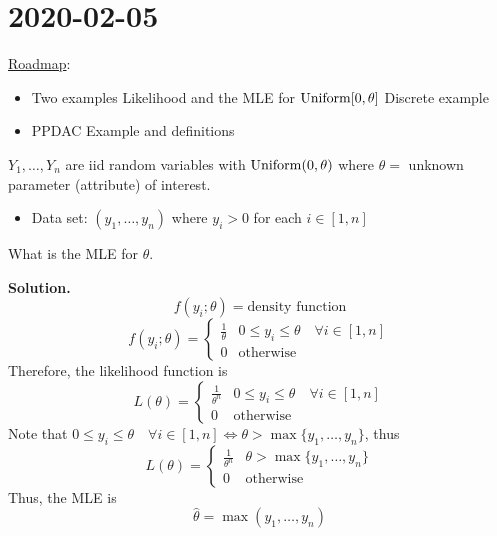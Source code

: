 \section{2020-02-05}
\underline{Roadmap}:
\begin{itemize}
    \item Two examples
          \subitem Likelihood and the MLE for $ \operatorname{Uniform}[0,\theta] $
          \subitem Discrete example
    \item PPDAC
          \subitem Example and definitions
\end{itemize}
\begin{exbox}
    \begin{example}\label{uniform mle}
        $ Y_1,\ldots ,Y_n $ are iid random variables with $ \operatorname{Uniform}(0,\theta) $
        where $ \theta= $ unknown parameter (attribute) of interest.
        \begin{itemize}
            \item Data set: $ (y_1,\ldots ,y_n) $ where $ y_i>0 $ for each $ i\in[1,n] $
        \end{itemize}
        What is the MLE for $ \theta $.

        \textbf{Solution.}
        \[ f(y_i;\theta)=\text{density function} \]
        \[ f(y_i;\theta)=
            \begin{cases}
                \frac{1}{\theta} & 0\leqslant y_i \leqslant \theta\quad\forall i\in[1,n] \\
                0                & \text{otherwise}
            \end{cases} \]
        Therefore, the likelihood function is
        \[ L(\theta)=
            \begin{cases}
                \frac{1}{\theta^n} & 0\leqslant y_i\leqslant \theta\quad\forall i\in[1,n] \\
                0                  & \text{otherwise}
            \end{cases} \]
        Note that $ 0\leqslant y_i\leqslant \theta\quad\forall i\in[1,n]\iff
            \theta>\max\{y_1,\ldots ,y_n\} $, thus
        \[ L(\theta)=
            \begin{cases}
                \frac{1}{\theta^n} & \theta>\max \{y_1,\ldots ,y_n\} \\
                0                  & \text{otherwise}
            \end{cases} \]
        Thus, the MLE is
        \[ \hat{\theta}=\max(y_1,\ldots ,y_n) \]
    \end{example}
\end{exbox}

